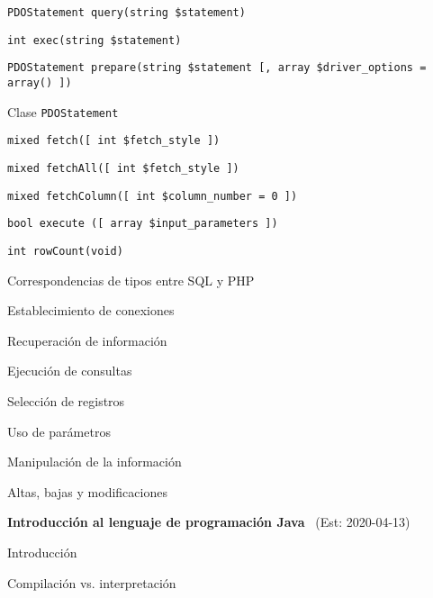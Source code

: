\begin{longenum}
\begin{longenum}
\begin{longenum}
\begin{longenum}
                \item \texttt{PDOStatement query(string \$statement)}
                \item \texttt{int exec(string \$statement)}
                \item \texttt{PDOStatement prepare(string \$statement [, array \$driver\_options = array() ])}
            \end{longenum}
            \item Clase \texttt{PDOStatement}
            \begin{longenum}
                \item \texttt{mixed fetch([ int \$fetch\_style ])}
                \item \texttt{mixed fetchAll([ int \$fetch\_style ])}
                \item \texttt{mixed fetchColumn([ int \$column\_number = 0 ])}
                \item \texttt{bool execute ([ array \$input\_parameters ])}
                \item \texttt{int rowCount(void)}
            \end{longenum}
            \item Correspondencias de tipos entre SQL y PHP
        \end{longenum}
        \item Establecimiento de conexiones
        \item Recuperación de información
        \begin{longenum}
            \item Ejecución de consultas
            \item Selección de registros
            \item Uso de parámetros
        \end{longenum}
        \item Manipulación de la información
        \begin{longenum}
            \item Altas, bajas y modificaciones
        \end{longenum}
    \end{longenum}
    \item \textbf{Introducción al lenguaje de programación Java} \ (Est: 2020-04-13)
    \begin{longenum}
        \item Introducción
        \item Compilación vs. interpretación
        \begin{longenum}

\end{longenum}
\end{longenum}
\end{longenum}
